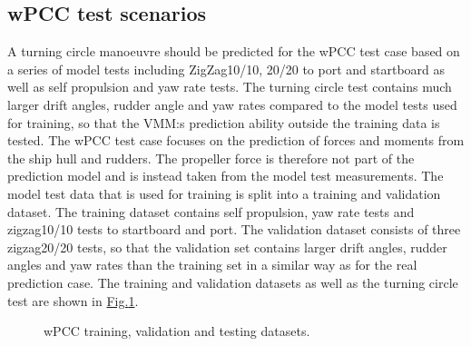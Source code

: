 \documentclass[review]{elsarticle}
\begin{document}
\subsection{wPCC test scenarios}
\label{\detokenize{05.01_case_studies:wpcc-test-scenarios}}
\sphinxAtStartPar
A turning circle manoeuvre should be predicted for the wPCC test case based on a series of model tests including ZigZag10/10, 20/20 to port and startboard as well as self propulsion and yaw rate tests. The turning circle test contains much larger drift angles, rudder angle and yaw rates compared to the model tests used for training, so that the VMM:s prediction ability outside the training data is tested.
The wPCC test case focuses on the prediction of forces and moments from the ship hull and rudders. The propeller force is therefore not part of the prediction model and is instead taken from the model test measurements.
The model test data that is used for training is split into a training and validation dataset. The training dataset contains self propulsion, yaw rate tests and zigzag10/10 tests to startboard and port. The validation dataset consists of three zigzag20/20 tests, so that the validation set contains larger drift angles, rudder angles and yaw rates than the training set in a similar way as for the real prediction case. The training and validation datasets as well as the turning circle test are shown in \hyperref[\detokenize{05.01_case_studies:fig-traintest}]{Fig.\@ \ref{\detokenize{05.01_case_studies:fig-traintest}}}.

\begin{figure}[H]
\centering
\capstart

\noindent{}
\caption{wPCC training, validation and testing datasets.}\label{\detokenize{05.01_case_studies:fig-traintest}}\end{figure}
\end{document}
